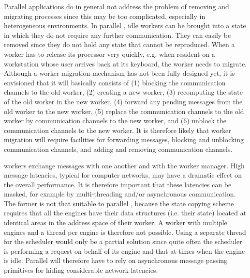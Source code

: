 Parallel applications do in general not address the problem of removing
and migrating processes since this may be too complicated, especially
in heterogeneous environments. In parallel \eclipse, idle workers can
be brought into a state in which they do not require any further
communication. They can easily be removed since they do not hold any
state that cannot be reproduced. When a worker has to release its
processor very quickly, e.g. when resident on a workstation whose
user arrives back at its keyboard, the worker needs to migrate. Although 
a worker migration mechanism has not been fully designed yet, it is 
envisioned that it will basically consists of (1) blocking the communication 
channels to the old worker, (2) creating a new worker, (3) recomputing the 
state of the old worker in the new worker, (4) forward any pending messages 
from the old worker to the new worker, (5) replace the communication 
channels to the old worker by communication channels to the new worker, 
and (6) unblock the communication channels to the new worker. It is 
therefore likely that worker migration will require facilities for 
forwarding messages, blocking and unblocking communication channels, and 
adding and removing communication channels.

\eclipse workers exchange messages with one another and with the worker
manager. High message latencies, typical for computer networks, may have 
a dramatic effect on the overall performance. It is therefore important
that these latencies can be masked, for example by multi-threading and/or
asynchronous communication. The former is not that suitable to parallel
\eclipse, because the state copying scheme requires that all the engines 
have their data structures (i.e. their state) located at identical areas 
in the address space of their worker. A worker with multiple engines and
a thread per engine is therefore not possible. Using a separate thread for 
the scheduler would only be a partial solution since quite often the scheduler 
is performing a request on behalf of its engine and that at times when the 
engine is idle. Parallel \eclipse will therefore have to rely on asynchronous
message passing primitives for hiding considerable network latencies.

